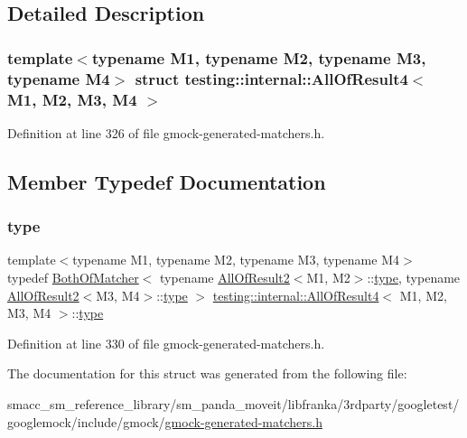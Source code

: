 \subsection{Detailed Description}
\subsubsection*{template$<$typename M1, typename M2, typename M3, typename M4$>$\newline
struct testing\+::internal\+::\+All\+Of\+Result4$<$ M1, M2, M3, M4 $>$}



Definition at line 326 of file gmock-\/generated-\/matchers.\+h.



\subsection{Member Typedef Documentation}
\mbox{\label{structtesting_1_1internal_1_1AllOfResult4_ab277e20178bac632d4e5a39a1a407bbf}} 
\subsubsection{\texorpdfstring{type}{type}}
{\footnotesize\ttfamily template$<$typename M1, typename M2, typename M3, typename M4$>$ \\
typedef \hyperlink{classtesting_1_1internal_1_1BothOfMatcher}{Both\+Of\+Matcher}$<$ typename \hyperlink{structtesting_1_1internal_1_1AllOfResult2}{All\+Of\+Result2}$<$M1, M2$>$\+::\hyperlink{structtesting_1_1internal_1_1AllOfResult4_ab277e20178bac632d4e5a39a1a407bbf}{type}, typename \hyperlink{structtesting_1_1internal_1_1AllOfResult2}{All\+Of\+Result2}$<$M3, M4$>$\+::\hyperlink{structtesting_1_1internal_1_1AllOfResult4_ab277e20178bac632d4e5a39a1a407bbf}{type} $>$ \hyperlink{structtesting_1_1internal_1_1AllOfResult4}{testing\+::internal\+::\+All\+Of\+Result4}$<$ M1, M2, M3, M4 $>$\+::\hyperlink{structtesting_1_1internal_1_1AllOfResult4_ab277e20178bac632d4e5a39a1a407bbf}{type}}



Definition at line 330 of file gmock-\/generated-\/matchers.\+h.



The documentation for this struct was generated from the following file\+:\begin{DoxyCompactItemize}
\item 
smacc\+\_\+sm\+\_\+reference\+\_\+library/sm\+\_\+panda\+\_\+moveit/libfranka/3rdparty/googletest/googlemock/include/gmock/\hyperlink{gmock-generated-matchers_8h}{gmock-\/generated-\/matchers.\+h}\end{DoxyCompactItemize}
